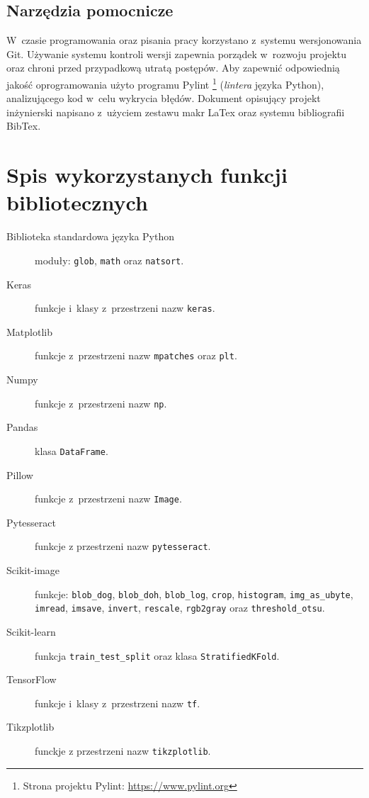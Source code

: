 \section{Narzędzia pomocnicze}
W~czasie programowania oraz pisania pracy korzystano z~systemu wersjonowania
Git.
Używanie systemu kontroli wersji zapewnia porządek w~rozwoju projektu oraz
chroni przed przypadkową utratą postępów.
Aby zapewnić odpowiednią jakość oprogramowania użyto programu Pylint%
\footnote{%
    Strona projektu Pylint: \url{https://www.pylint.org}}
(\emph{lintera} języka Python), analizującego kod w~celu wykrycia błędów.
Dokument opisujący projekt inżynierski napisano z~użyciem zestawu makr LaTex
oraz systemu bibliografii BibTex.

\chapter{Spis wykorzystanych funkcji bibliotecznych}
\begin{description}
    \item[Biblioteka standardowa języka Python] moduły: \texttt{glob},
          \texttt{math} oraz \texttt{natsort}.
    \item[Keras] funkcje i~klasy z~przestrzeni nazw \texttt{keras}.
    \item[Matplotlib] funkcje z~przestrzeni nazw \texttt{mpatches} oraz
          \texttt{plt}.
    \item[Numpy] funkcje z~przestrzeni nazw \texttt{np}.
    \item[Pandas] klasa \texttt{DataFrame}.
    \item[Pillow] funkcje z~przestrzeni nazw \texttt{Image}.
    \item[Pytesseract] funkcje z przestrzeni nazw \texttt{pytesseract}.
    \item[Scikit-image] funkcje: \texttt{blob\_dog}, \texttt{blob\_doh},
          \texttt{blob\_log}, \texttt{crop}, \texttt{histogram},
          \texttt{img\_as\_ubyte}, \texttt{imread}, \texttt{imsave},
          \texttt{invert}, \texttt{rescale}, \texttt{rgb2gray} oraz
          \texttt{threshold\_otsu}.
    \item[Scikit-learn] funkcja \texttt{train\_test\_split} oraz klasa 
          \texttt{StratifiedKFold}.
    \item[TensorFlow] funkcje i~klasy z~przestrzeni nazw \texttt{tf}.
    \item[Tikzplotlib] funckje z przestrzeni nazw \texttt{tikzplotlib}.   
\end{description}
